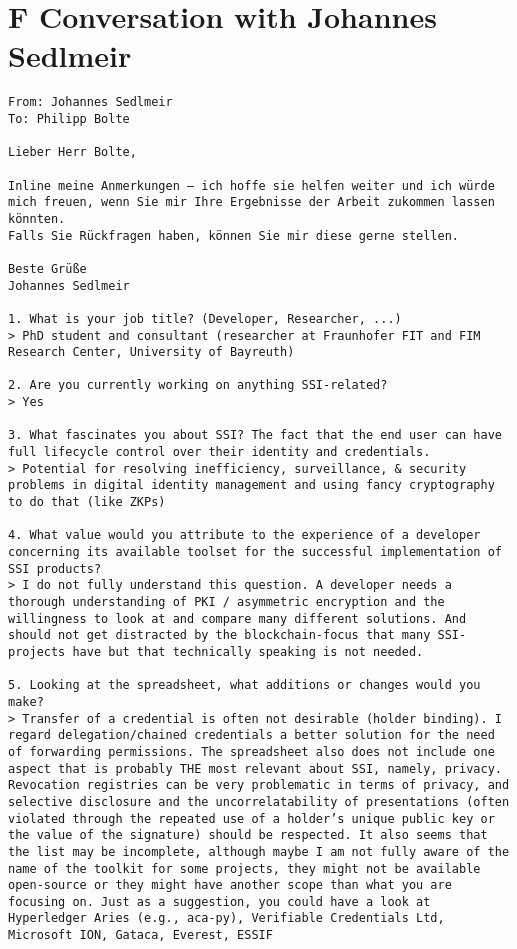 \section*{F Conversation with Johannes Sedlmeir}\label{appendix: sedlmeir}
\begin{Verbatim}[breaklines=true, breaksymbol={}, breaksymbolsepleftnchars=2]
From: Johannes Sedlmeir
To: Philipp Bolte

Lieber Herr Bolte,
 
Inline meine Anmerkungen – ich hoffe sie helfen weiter und ich würde mich freuen, wenn Sie mir Ihre Ergebnisse der Arbeit zukommen lassen könnten.
Falls Sie Rückfragen haben, können Sie mir diese gerne stellen.
 
Beste Grüße
Johannes Sedlmeir

1. What is your job title? (Developer, Researcher, ...) 
> PhD student and consultant (researcher at Fraunhofer FIT and FIM Research Center, University of Bayreuth)

2. Are you currently working on anything SSI-related? 
> Yes

3. What fascinates you about SSI? The fact that the end user can have full lifecycle control over their identity and credentials. 
> Potential for resolving inefficiency, surveillance, & security problems in digital identity management and using fancy cryptography to do that (like ZKPs)

4. What value would you attribute to the experience of a developer concerning its available toolset for the successful implementation of SSI products? 
> I do not fully understand this question. A developer needs a thorough understanding of PKI / asymmetric encryption and the willingness to look at and compare many different solutions. And should not get distracted by the blockchain-focus that many SSI-projects have but that technically speaking is not needed.

5. Looking at the spreadsheet, what additions or changes would you make? 
> Transfer of a credential is often not desirable (holder binding). I regard delegation/chained credentials a better solution for the need of forwarding permissions. The spreadsheet also does not include one aspect that is probably THE most relevant about SSI, namely, privacy. Revocation registries can be very problematic in terms of privacy, and selective disclosure and the uncorrelatability of presentations (often violated through the repeated use of a holder’s unique public key or the value of the signature) should be respected. It also seems that the list may be incomplete, although maybe I am not fully aware of the name of the toolkit for some projects, they might not be available open-source or they might have another scope than what you are focusing on. Just as a suggestion, you could have a look at Hyperledger Aries (e.g., aca-py), Verifiable Credentials Ltd, Microsoft ION, Gataca, Everest, ESSIF


\end{Verbatim}
